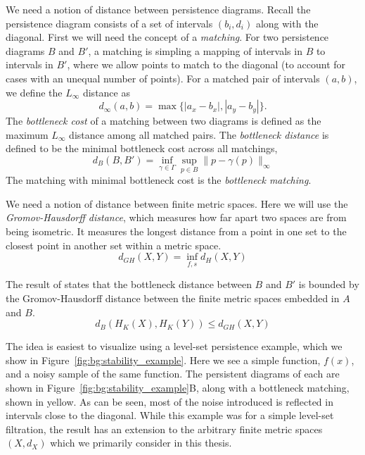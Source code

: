 We need a notion of distance between persistence diagrams.
Recall the persistence diagram consists of a set of intervals $(b_i,d_i)$ along with the diagonal.
First we will need the concept of a \emph{matching}.
For two persistence diagrams $B$ and $B'$, a matching is simpling a mapping of intervals in $B$ to intervals in $B'$, where we allow points to match to the diagonal (to account for cases with an unequal number of points).
For a matched pair of intervals $(a,b)$, we define the $L_{\infty}$ distance as
\begin{equation}
d_{\infty}(a,b) = \max\{ |a_{x}-b_{x}|, |a_{y}-b_{y}| \}.
\end{equation}
The \emph{bottleneck cost} of a matching between two diagrams is defined as the maximum $L_{\infty}$ distance among all matched pairs.
The \emph{bottleneck distance} is defined to be the minimal bottleneck cost across all matchings,
\begin{equation}
d_{B}(B,B') = \inf_{\gamma\in\Gamma}\sup_{p\in B}\|p-\gamma(p)\|_{\infty}
\end{equation}
The matching with minimal bottleneck cost is the \emph{bottleneck matching}.

We need a notion of distance between finite metric spaces.
Here we will use the \emph{Gromov-Hausdorff distance}, which measures how far apart two spaces are from being isometric.
It measures the longest distance from a point in one set to the closest point in another set within a metric space.
\begin{equation}
d_{GH}(X,Y)=\inf_{f,s} d_H(X,Y)
\end{equation}

The result of \cite{Chazal:2009wc} states that the bottleneck distance between $B$ and $B'$ is bounded by the Gromov-Hausdorff distance between the finite metric spaces embedded in $A$ and $B$.
\begin{equation}
d_{B}(H_{K}(X),H_{K}(Y)) \leq d_{GH}(X,Y)
\end{equation}

The idea is easiest to visualize using a level-set persistence example, which we show in Figure~\ref{fig:bg:stability_example}.
Here we see a simple function, $f(x)$, and a noisy sample of the same function.
The persistent diagrams of each are shown in Figure~\ref{fig:bg:stability_example}B, along with a bottleneck matching, shown in yellow.
As can be seen, most of the noise introduced is reflected in intervals close to the diagonal.
While this example was for a simple level-set filtration, the result has an extension to the arbitrary finite metric spaces $(X,d_{X})$ which we primarily consider in this thesis.

